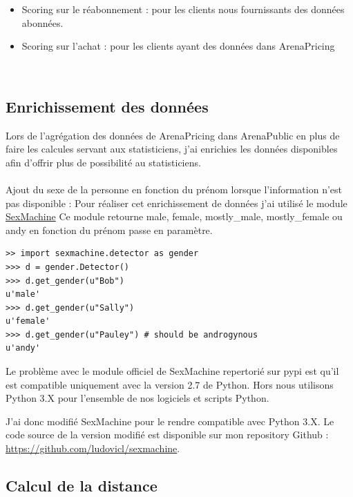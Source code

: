 \begin{itemize}
  \item[\textbullet] Scoring sur le réabonnement : pour les clients nous fournissants des données abonnées. 
  \item[\textbullet] Scoring sur l'achat : pour les clients ayant des données dans ArenaPricing  \end{itemize} \

\subsection{Enrichissement des données}

Lors de l'agrégation des données de ArenaPricing dans ArenaPublic en plus de faire les calcules servant aux statisticiens, j'ai enrichies les données disponibles afin d'offrir plus de possibilité au statisticiens.
\\ \\
Ajout du sexe de la personne en fonction du prénom lorsque l'information n'est pas disponible :
Pour réaliser cet enrichissement de données j'ai utilisé le module 
\href{https://github.com/ferhatelmas/sexmachine/}{SexMachine}
Ce module retourne male, female, mostly\_male, mostly\_female ou andy en fonction du prénom passe en paramètre.

\lstset{style=custompython}
\begin{lstlisting}
>> import sexmachine.detector as gender
>>> d = gender.Detector()
>>> d.get_gender(u"Bob")
u'male'
>>> d.get_gender(u"Sally")
u'female'
>>> d.get_gender(u"Pauley") # should be androgynous
u'andy'
\end{lstlisting}

Le problème avec le module officiel de SexMachine repertorié sur pypi est qu'il est compatible uniquement avec la version 2.7 de Python. Hors nous utilisons Python 3.X pour l'ensemble de nos logiciels et scripts Python. 

J'ai donc modifié SexMachine pour le rendre compatible avec Python 3.X. Le code source de la version modifié est disponible sur mon repository Github : \href{https://github.com/ludovicl/sexmachine}{https://github.com/ludovicl/sexmachine}.

\subsection{Calcul de la distance}

